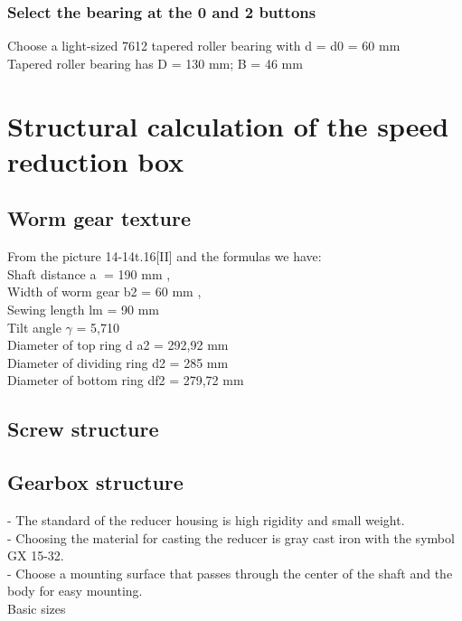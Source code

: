 \subsubsection{Select the bearing at the 0 and 2 buttons}
Choose a light-sized 7612 tapered roller bearing with d = d0 = 60 mm\\
Tapered roller bearing has D = 130 mm; B = 46 mm\\
\section{Structural calculation of the speed reduction box}
\subsection{Worm gear texture}
From the picture 14-14t.16[II] and the formulas we have:\\
	Shaft distance a = 190 mm ,\\
	Width of worm gear b2 = 60 mm ,\\
	Sewing length lm  = 90 mm\\
	Tilt angle $\gamma$ = 5,710\\
	Diameter of top ring d a2  = 292,92 mm \\
	Diameter of dividing ring d2  = 285 mm \\
	Diameter of bottom ring df2 = 279,72 mm \\
\subsection{Screw structure }
\subsection{Gearbox structure }
- The standard of the reducer housing is high rigidity and small weight. \\
- Choosing the material for casting the reducer is gray cast iron with the symbol GX 15-32. \\
- Choose a mounting surface that passes through the center of the shaft and the body for easy mounting.  \\
Basic sizes\\
